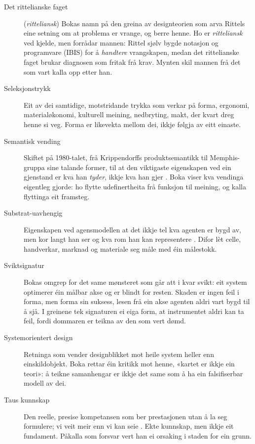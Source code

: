 \begin{description}
\item[Det rittelianske faget] (\textit{ritteliansk}) Bokas namn på den greina av designteorien som arva Rittels eine setning om at problema er vrange, og berre henne. Ho er \emph{ritteliansk} ved kjelde, men forrådar mannen: Rittel sjølv bygde notasjon og programvare (IBIS) for å \emph{handtere} vrangskapen, medan det rittelianske faget brukar diagnosen som fritak frå krav. Mynten skil mannen frå det som vart kalla opp etter han.

\item[Seleksjonstrykk] Eit av dei samtidige, motstridande trykka som verkar på forma, ergonomi, materialøkonomi, kulturell meining, nedbryting, makt, der kvart dreg henne si veg. Forma er likevekta mellom dei, ikkje følgja av eitt einaste.

\item[Semantisk vending] Skiftet på 1980-talet, frå Krippendorffs produktsemantikk til Memphis-gruppa sine talande former, til at den viktigaste eigenskapen ved ein gjenstand er kva han \emph{tyder}, ikkje kva han gjer \autocite{krippendorff2006,krippendorff1984semantics}. Boka viser kva vendinga eigentleg gjorde: ho flytte udefinertheita frå funksjon til meining, og kalla flyttinga eit framsteg.

\item[Substrat-uavhengig] Eigenskapen ved agensmodellen at det ikkje tel kva agenten er bygd av, men kor langt han ser og kva rom han kan representere \autocite{levin2022}. Difor lèt celle, handverkar, marknad og materiale seg måle med éin målestokk.

\item[Sviktsignatur] Bokas omgrep for det same mønsteret som går att i kvar svikt: eit system optimerer éin målbar akse og er blindt for resten. Skaden er ingen feil i forma, men forma sin suksess, lesen frå ein akse agenten aldri vart bygd til å sjå. I greinene tek signaturen ei eiga form, at instrumentet aldri kan ta feil, fordi dommaren er teikna av den som vert dømd.

\item[Systemorientert design] Retninga som vender designblikket mot heile system heller enn einskildobjekt. Boka rettar éin kritikk mot henne, «kartet er ikkje ein teori»: å teikne samanhengar er ikkje det same som å ha ein falsifiserbar modell av dei.

\item[Taus kunnskap] Den reelle, presise kompetansen som ber prestasjonen utan å la seg formulere; vi veit meir enn vi kan seie \autocite{polanyi1966tacit}. Ekte kunnskap, men ikkje eit fundament. Påkalla som forsvar vert han ei orsaking i staden for ein grunn.


\end{description}
